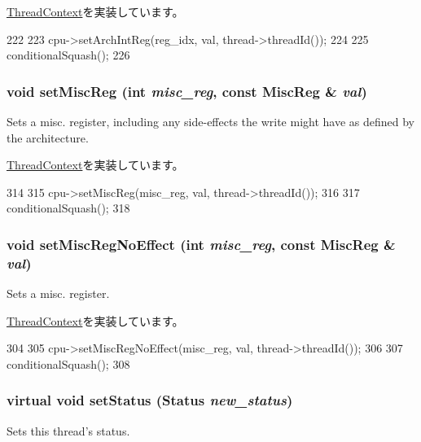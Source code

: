 \hyperlink{classThreadContext_a017c099cd6087484b0eb1892809b0572}{ThreadContext}を実装しています。


\begin{DoxyCode}
222 {
223     cpu->setArchIntReg(reg_idx, val, thread->threadId());
224 
225     conditionalSquash();
226 }
\end{DoxyCode}
\hypertarget{classO3ThreadContext_a1877dde4f3eb17a8b7d33ea40176c148}{
\subsubsection[{setMiscReg}]{\setlength{\rightskip}{0pt plus 5cm}void setMiscReg (int {\em misc\_\-reg}, \/  const {\bf MiscReg} \& {\em val})}}
\label{classO3ThreadContext_a1877dde4f3eb17a8b7d33ea40176c148}
Sets a misc. register, including any side-\/effects the write might have as defined by the architecture. 

\hyperlink{classThreadContext_a074166dc2fe3c4aea3ad588ed9883c51}{ThreadContext}を実装しています。


\begin{DoxyCode}
314 {
315     cpu->setMiscReg(misc_reg, val, thread->threadId());
316 
317     conditionalSquash();
318 }
\end{DoxyCode}
\hypertarget{classO3ThreadContext_a763517aaea2f3decbc1ef9d064216b6f}{
\subsubsection[{setMiscRegNoEffect}]{\setlength{\rightskip}{0pt plus 5cm}void setMiscRegNoEffect (int {\em misc\_\-reg}, \/  const {\bf MiscReg} \& {\em val})}}
\label{classO3ThreadContext_a763517aaea2f3decbc1ef9d064216b6f}
Sets a misc. register. 

\hyperlink{classThreadContext_a2987c1ff22ebdf6cdf354a31462bdbfb}{ThreadContext}を実装しています。


\begin{DoxyCode}
304 {
305     cpu->setMiscRegNoEffect(misc_reg, val, thread->threadId());
306 
307     conditionalSquash();
308 }
\end{DoxyCode}
\hypertarget{classO3ThreadContext_afd2e0894c5e6d90253525390acf6e6dd}{
\subsubsection[{setStatus}]{\setlength{\rightskip}{0pt plus 5cm}virtual void setStatus ({\bf Status} {\em new\_\-status})}}
\label{classO3ThreadContext_afd2e0894c5e6d90253525390acf6e6dd}
Sets this thread's status. 

